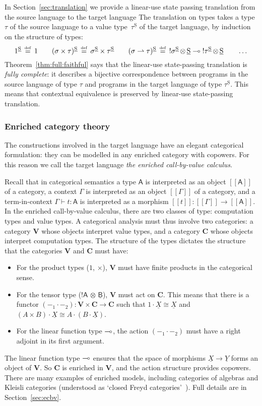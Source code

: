\documentclass{LMCS}
\newcommand{\pto}{\rightharpoonup}
\newcommand{\comptype}[1]{\underline{#1}}
\newcommand{\algX}{{\comptype{X}}}
\newcommand{\algY}{{\comptype{Y}}}
\newcommand{\VA}{\mathsf{A}}
\newcommand{\CB}{\comptype{\mathsf{B}}}
\newcommand{\tensor}{\otimes}
\newcommand{\ltensortype}[2]{{!} #1 \, {\tensor} \, #2}
\newcommand{\CBVtoEECbase}[2]{#2^{#1}}
\newcommand{\VCat}{\fixedcatfont{V}} \newcommand{\CCat}{\fixedcatfont{C}} \newcommand{\DCat}{\fixedcatfont{D}}
\newcommand{\ltensor}[2]{#1 \cdot #2}
\newcommand{\ltensorname}{\ltensor {-_1}{-_2}}
\newcommand{\fixedcatfont}{\mathbf}
\newcommand{\denlb}{[\![}
\newcommand{\denrb}{]\!]}
\newcommand{\den}[1]{\denlb{#1}\denrb}
\newcommand{\states}{{\underline{\mathrm{S}}}}
\newcommand{\defeq}{\mathrel{\,\stackrel{\mbox{\tiny{$\mathrm{def}$}}}=\,}}
\begin{document}
In Section~\ref{sec:translation}
we provide a linear-use state passing translation
from the source language to the target language
The translation on types 
takes a type $\tau$ 
of the source language to a value type~$\CBVtoEECbase \states\tau$ of the target language, by induction on the structure of types:
\[
\CBVtoEECbase \states 1\defeq 1
\qquad
\CBVtoEECbase \states {(\sigma\times \tau)} 
\defeq 
\CBVtoEECbase \states{\sigma}
\times \CBVtoEECbase \states\tau
\qquad
\CBVtoEECbase \states{(\sigma\pto\tau)}
\defeq 
\ltensortype{\CBVtoEECbase \states\sigma}\states\lpop
\ltensortype{\CBVtoEECbase \states\tau}\states\qquad\dots
\]
Theorem~\ref{thm:full:faithful} says that 
the linear-use state-passing translation is \emph{fully complete}:
it describes a bijective correspondence between
programs in the source language of type $\tau$ 
and programs in the target language of type $\CBVtoEECbase \states\tau$.
This means that contextual equivalence is preserved by 
linear-use state-passing translation.

\subsubsection*{Enriched category theory}
The constructions involved in the target language
have an elegant categorical formulation:
they can be modelled in any enriched 
category with copowers. For this reason we call 
the target language \emph{the enriched call-by-value calculus}.

Recall that in categorical semantics
a type $\VA$ is interpreted as an object $\den\VA$ of a category,
a context $\Gamma$ 
is interpreted as an object $\den\Gamma$ of a category,
and a term-in-context $\Gamma\vdash t : \VA$ is interpreted
as a morphism $\den t:\den\Gamma\to \den\VA$.
In the enriched call-by-value calculus,
there are two classes of type: computation types and value types.
A categorical analysis must thus involve two categories:
a category $\VCat$ whose objects interpret value types,
and a category $\CCat$ whose objects interpret computation types.
The structure of the types dictates the  
structure that the categories $\VCat$ and $\CCat$ must have:
\begin{itemize}
\item For the product types ($1$, $\times$), $\VCat$ must have
finite products in the categorical sense.
\item For the tensor type ($\ltensortype \VA\CB$),
$\VCat$ must act on $\CCat$. This means that there is a functor
$(\ltensorname):\VCat\times\CCat\to \CCat$ such that
$\ltensor 1\algX\cong \algX$ and 
$\ltensor{(A\times B)} \algX\cong \ltensor A {(\ltensor B \algX)}$.
\item For the linear function type $\multimap$,
the action $(\ltensorname)$ must have a right adjoint in
its first argument.
\end{itemize}
The linear function type $\multimap$ ensures that the 
space of 
morphisms $\algX \to \algY$ forms an object of $\VCat$.
So $\CCat$ is enriched in $\VCat$, and the action structure
provides copowers.
There are many examples of enriched models, including 
categories of algebras and Kleisli categories
(understood as `closed Freyd categories'~\cite{Levy:03}). 
Full details are in Section~\ref{sec:ecbv}. 
\end{document}
